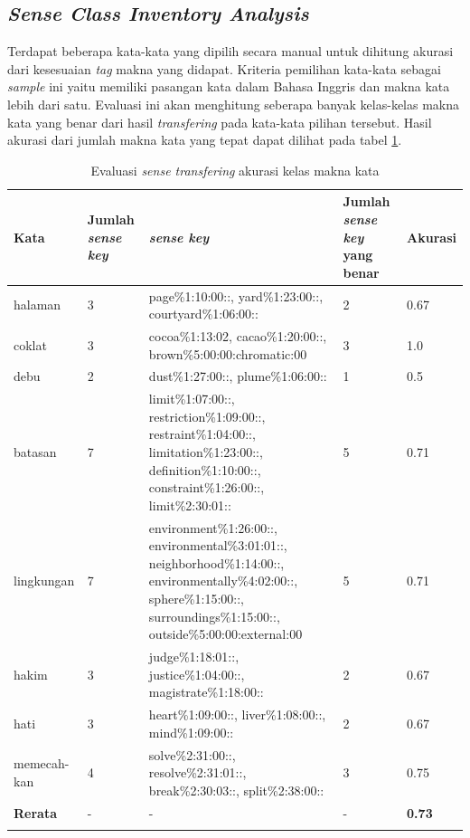 \subsection{\textit{Sense Class Inventory Analysis}}

Terdapat beberapa kata-kata yang dipilih secara manual untuk dihitung akurasi dari kesesuaian \textit{tag} makna yang didapat. Kriteria pemilihan kata-kata sebagai \textit{sample} ini yaitu memiliki pasangan kata  dalam Bahasa Inggris dan makna kata lebih dari satu. Evaluasi ini akan menghitung seberapa banyak kelas-kelas makna kata yang benar dari hasil \textit{transfering} pada kata-kata pilihan tersebut. Hasil akurasi dari jumlah makna kata yang tepat dapat dilihat pada tabel \ref{table:akuras-kelas-makna-kata}.

\begin{longtable}{|p{1.8cm}|p{1.2cm}|p{5cm}|p{1.2cm}|p{1.5cm}|} 
	\hline
	\textbf{Kata} & \textbf{Jumlah \textit{sense key}} & \textbf{\textit{sense key}}  & \textbf{Jumlah \textit{sense key} yang benar} & \textbf{Akurasi} \\ \hline
	halaman & 3 &  page\%1:10:00::, yard\%1:23:00::, courtyard\%1:06:00:: & 2 & 0.67 \\ \hline
	coklat & 3 & cocoa\%1:13:02, cacao\%1:20:00::, brown\%5:00:00:chromatic:00 & 3 & 1.0 \\ \hline
	debu & 2 & dust\%1:27:00::, plume\%1:06:00:: & 1 & 0.5 \\ \hline
	batasan & 7 & limit\%1:07:00::, restriction\%1:09:00::, restraint\%1:04:00::, limitation\%1:23:00::, definition\%1:10:00::, constraint\%1:26:00::, limit\%2:30:01:: & 5 & 0.71 \\ \hline
	lingkungan & 7 & environment\%1:26:00::, environmental\%3:01:01::, neighborhood\%1:14:00::, environmentally\%4:02:00::, sphere\%1:15:00::, surroundings\%1:15:00::, outside\%5:00:00:external:00 & 5 & 0.71 \\ \hline
	hakim & 3 & judge\%1:18:01::, justice\%1:04:00::, magistrate\%1:18:00:: & 2 & 0.67 \\ \hline
	hati & 3 & heart\%1:09:00::, liver\%1:08:00::, mind\%1:09:00:: & 2 & 0.67 \\ \hline
	memecah-kan & 4 & solve\%2:31:00::, resolve\%2:31:01::, break\%2:30:03::, split\%2:38:00:: & 3 & 0.75 \\ \hline
	\hline
	\textbf{Rerata} & - & - & - & \textbf{0.73} \\ \hline
	\caption{Evaluasi \textit{sense transfering} akurasi kelas makna kata}
	\label{table:akuras-kelas-makna-kata}
\end{longtable}
 
